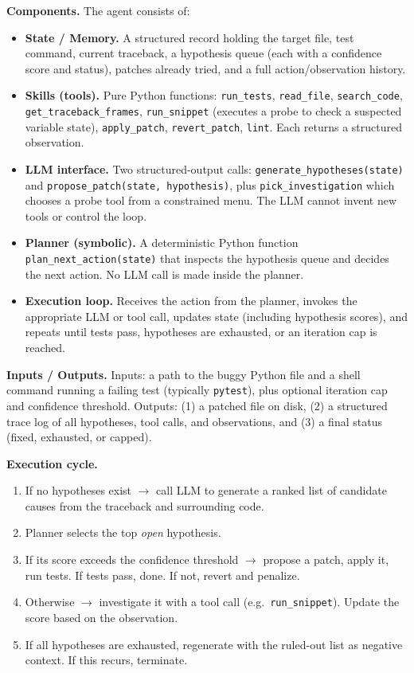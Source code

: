 \documentclass[11pt]{article}
\begin{document}
\textbf{Components.} The agent consists of:
\begin{itemize}
    \item \textbf{State / Memory.} A structured record holding the target file, test command, current traceback, a hypothesis queue (each with a confidence score and status), patches already tried, and a full action/observation history.
    \item \textbf{Skills (tools).} Pure Python functions: \texttt{run\_tests}, \texttt{read\_file}, \texttt{search\_code}, \texttt{get\_traceback\_frames}, \texttt{run\_snippet} (executes a probe to check a suspected variable state), \texttt{apply\_patch}, \texttt{revert\_patch}, \texttt{lint}. Each returns a structured observation.
    \item \textbf{LLM interface.} Two structured-output calls: \texttt{generate\_hypotheses(state)} and \texttt{propose\_patch(state, hypothesis)}, plus \texttt{pick\_investigation} which chooses a probe tool from a constrained menu. The LLM cannot invent new tools or control the loop.
    \item \textbf{Planner (symbolic).} A deterministic Python function \texttt{plan\_next\_action(state)} that inspects the hypothesis queue and decides the next action. No LLM call is made inside the planner.
    \item \textbf{Execution loop.} Receives the action from the planner, invokes the appropriate LLM or tool call, updates state (including hypothesis scores), and repeats until tests pass, hypotheses are exhausted, or an iteration cap is reached.
\end{itemize}

\textbf{Inputs / Outputs.} Inputs: a path to the buggy Python file and a shell command running a failing test (typically \texttt{pytest}), plus optional iteration cap and confidence threshold. Outputs: (1) a patched file on disk, (2) a structured trace log of all hypotheses, tool calls, and observations, and (3) a final status (fixed, exhausted, or capped).

\textbf{Execution cycle.}
\begin{enumerate}
    \item If no hypotheses exist $\rightarrow$ call LLM to generate a ranked list of candidate causes from the traceback and surrounding code.
    \item Planner selects the top \emph{open} hypothesis.
    \item If its score exceeds the confidence threshold $\rightarrow$ propose a patch, apply it, run tests. If tests pass, done. If not, revert and penalize.
    \item Otherwise $\rightarrow$ investigate it with a tool call (e.g.\ \texttt{run\_snippet}). Update the score based on the observation.
    \item If all hypotheses are exhausted, regenerate with the ruled-out list as negative context. If this recurs, terminate.
\end{enumerate}
\end{document}

